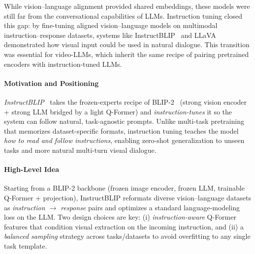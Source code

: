 \newpage

\begin{enrichment}
    \label{enr:sec_chapter24_instrprecursors}
    While vision--language alignment provided shared embeddings, these models were still far from the conversational capabilities of LLMs. Instruction tuning closed this gap: by fine-tuning aligned vision--language models on multimodal instruction–response datasets, systems like InstructBLIP~\cite{dai2023_instructblip} and LLaVA~\cite{liu2023_llava} demonstrated how visual input could be used in natural dialogue. This transition was essential for video-LLMs, which inherit the same recipe of pairing pretrained encoders with instruction-tuned LLMs.
    
    \begin{enrichment}
        \label{enr:subsec_chapter24_instructblip}
        
        \paragraph{Motivation and Positioning}
        \textit{InstructBLIP}~\cite{dai2023_instructblip} takes the frozen-experts recipe of BLIP-2~\cite{li2023_blip2} (strong vision encoder + strong LLM bridged by a light Q-Former) and \emph{instruction-tunes} it so the system can follow natural, task-agnostic prompts. Unlike multi-task pretraining that memorizes dataset-specific formats, instruction tuning teaches the model \emph{how to read and follow instructions}, enabling zero-shot generalization to unseen tasks and more natural multi-turn visual dialogue.
        
        \paragraph{High-Level Idea}
        Starting from a BLIP-2 backbone (frozen image encoder, frozen LLM, trainable Q-Former + projection), InstructBLIP reformats diverse vision–language datasets as \emph{instruction $\rightarrow$ response} pairs and optimizes a standard language-modeling loss on the LLM. Two design choices are key: (i) \emph{instruction-aware} Q-Former features that condition visual extraction on the incoming instruction, and (ii) a \emph{balanced sampling} strategy across tasks/datasets to avoid overfitting to any single task template.
        

\end{enrichment}
\end{enrichment}
